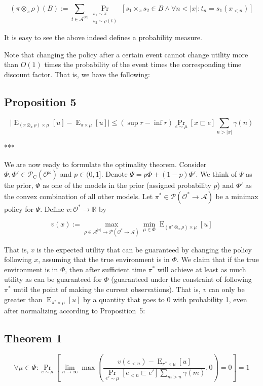 \documentclass[a4paper]{article}
\DeclareMathOperator{\Prb}{Pr}
\DeclareMathOperator{\E}{E}
\newcommand{\PP}[2]{\operatorname{Pr}_{\substack{#1 \\ #2}}}
\newcommand{\Reals}{\mathbb{R}}
\newcommand{\Abs}[1]{\lvert #1 \rvert}
\newcommand{\Prob}{\mathcal{P}}
\newcommand{\Act}{\mathcal{A}}
\newcommand{\Obs}{\mathcal{O}}
\newcommand{\ObsO}{\Obs^\omega}
\newcommand{\Pol}{\Obs^* \rightarrow \Act}
\newcommand{\CC}{\mathcal{P}_{\operatorname{C}}}
\begin{document}
$$(\pi \otimes_x \rho)(B):=\sum_{t \in \Act^{\Abs{x}}} \PP{s_1 \sim \pi}{s_2 \sim \rho(t)}[s_1 \times_x s_2 \in B \land \forall n < \Abs{x}: t_n=s_1(x_{<n})]$$ 

It is easy to see the above indeed defines a probability measure.

Note that changing the policy after a certain event cannot change utility more than ${O(1)}$ times the probability of the event times the corresponding time discount factor. That is, we have the following:

\subsection{Proposition 5}

$$\Abs{\E_{(\pi \otimes_x \rho) \times \mu}[u]-\E_{\pi \times \mu}[u]} \leq (\sup r - \inf r) \Prb_{e \sim \mu}[x \sqsubset e] \sum_{n > \Abs{x}} \gamma(n)$$

***

We are now ready to formulate the optimality theorem. Consider ${\Phi,\Phi' \in \CC(\ObsO)}$ and ${p \in (0,1]}$. Denote ${\Psi = p \Phi + (1-p) \Phi'}$. We think of ${\Psi}$ as the prior, ${\Phi}$ as one of the models in the prior (assigned probability ${p}$) and ${\Phi'}$ as the convex combination of all other models. Let ${\pi^* \in \Prob(\Pol)}$ be a minimax policy for ${\Psi}$. Define ${v: \Obs^* \rightarrow \Reals}$ by

$$v(x):=\max_{\rho \in \Act^{\Abs{x}} \rightarrow \Prob(\Pol)} \min_{\mu \in \Phi} \E_{(\pi^* \otimes_x \rho) \times \mu}[u]$$

That is, ${v}$ is the expected utility that can be guaranteed by changing the policy following ${x}$, assuming that the true environment is in ${\Phi}$. We claim that if the true environment is in ${\Phi}$, then after sufficient time ${\pi^*}$ will achieve at least as much utility as can be guaranteed for ${\Phi}$ (guaranteed under the constraint of following ${\pi^*}$ until the point of making the current observations). That is, ${v}$ can only be greater than ${\E_{\pi^* \times \mu}[u]}$ by a quantity that goes to 0 with probability 1, even after normalizing according to Proposition~5:

\subsection{Theorem 1}

$$\forall \mu \in \Phi: \Prb_{e \sim \mu}[\lim_{n \rightarrow \infty} \max(\frac{v(e_{<n})-\E_{\pi^* \times \mu}[u]}{\Prb_{e' \sim \mu}[e_{<n} \sqsubset e'] \sum_{m > n} \gamma(m)},0)=0] = 1$$
\end{document}
